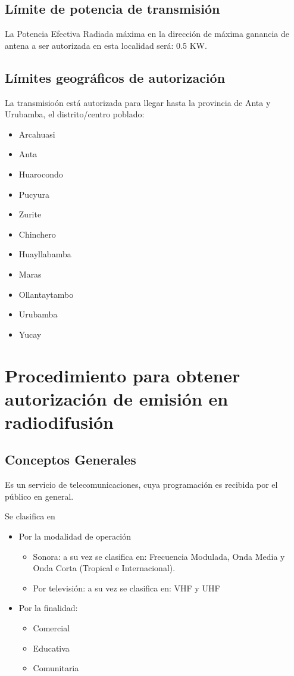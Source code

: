 \documentclass[a4paper]{IEEEtran} %
\begin{document}
\subsection{Límite de potencia de transmisión}

La Potencia Efectiva Radiada máxima en la dirección de máxima ganancia de antena a ser autorizada en esta localidad será: 0.5 KW.

\subsection{Límites geográficos de autorización}

La transmisioón está autorizada para llegar hasta la provincia de Anta y Urubamba, el distrito/centro poblado:

\begin{itemize}
	\item Arcahuasi
	\item Anta
	\item Huarocondo
	\item Pucyura
	\item Zurite
	\item Chinchero
	\item Huayllabamba
	\item Maras
	\item Ollantaytambo
	\item Urubamba
	\item Yucay
\end{itemize}


\section{Procedimiento para obtener autorización de emisión en radiodifusión}

\subsection{Conceptos Generales}
Es un servicio de telecomunicaciones, cuya 
programación es recibida por el público en 
general. 

Se clasifica en 

\begin{itemize}
	\item Por la modalidad de operación
	\begin{itemize}
		\item Sonora: a su vez se clasifica en: 
		Frecuencia Modulada, Onda Media y 
		Onda Corta (Tropical e Internacional).
		\item Por televisión: a  su  vez  se  clasifica  en: 
		VHF y UHF
	\end{itemize}
	\item Por la finalidad:
	\begin{itemize}
		\item Comercial
		\item Educativa
		\item Comunitaria
	\end{itemize}
\end{itemize}
\end{document}
